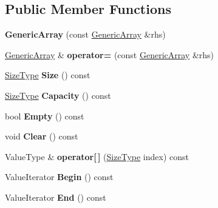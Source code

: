 \subsection*{Public Member Functions}
\begin{DoxyCompactItemize}
\item 
{\bfseries Generic\+Array} (const \hyperlink{a00114}{Generic\+Array} \&rhs)\hypertarget{a00114_aa589d897a194b349d5053391a6f1491d}{}\label{a00114_aa589d897a194b349d5053391a6f1491d}

\item 
\hyperlink{a00114}{Generic\+Array} \& {\bfseries operator=} (const \hyperlink{a00114}{Generic\+Array} \&rhs)\hypertarget{a00114_addbff152092d0998b2c550bd575f4b83}{}\label{a00114_addbff152092d0998b2c550bd575f4b83}

\item 
\hyperlink{a00677_a5ed6e6e67250fadbd041127e6386dcb5}{Size\+Type} {\bfseries Size} () const \hypertarget{a00114_a9666a5feb3fccbcec330b53742d00371}{}\label{a00114_a9666a5feb3fccbcec330b53742d00371}

\item 
\hyperlink{a00677_a5ed6e6e67250fadbd041127e6386dcb5}{Size\+Type} {\bfseries Capacity} () const \hypertarget{a00114_a12717a6bcd3949dea08ae19a9e940d58}{}\label{a00114_a12717a6bcd3949dea08ae19a9e940d58}

\item 
bool {\bfseries Empty} () const \hypertarget{a00114_a85c783f2f31684901cc2fbf178b1aba5}{}\label{a00114_a85c783f2f31684901cc2fbf178b1aba5}

\item 
void {\bfseries Clear} () const \hypertarget{a00114_a9a67311453f8941f0ac1b5471ec6b99f}{}\label{a00114_a9a67311453f8941f0ac1b5471ec6b99f}

\item 
Value\+Type \& {\bfseries operator\mbox{[}$\,$\mbox{]}} (\hyperlink{a00677_a5ed6e6e67250fadbd041127e6386dcb5}{Size\+Type} index) const \hypertarget{a00114_ac928627968bcfff4746f04c2cdd103ef}{}\label{a00114_ac928627968bcfff4746f04c2cdd103ef}

\item 
Value\+Iterator {\bfseries Begin} () const \hypertarget{a00114_a04cb899ae93f89ba91fab09381d731d3}{}\label{a00114_a04cb899ae93f89ba91fab09381d731d3}

\item 
Value\+Iterator {\bfseries End} () const \hypertarget{a00114_aa75006f979b2d810e6ab0ff4f755cf32}{}\label{a00114_aa75006f979b2d810e6ab0ff4f755cf32}


\end{DoxyCompactItemize}
